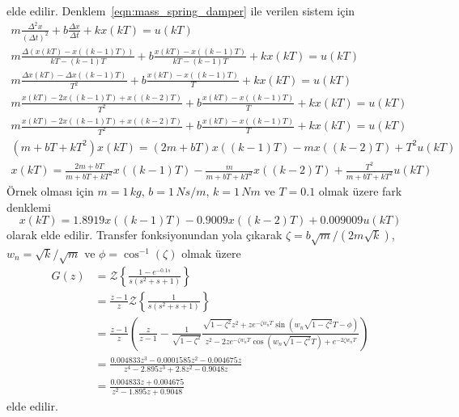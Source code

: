 elde edilir. Denklem~\ref{eqn:mass_spring_damper} ile verilen sistem için 
\begin{gather}
    m\frac{\Delta^2 x}{(\Delta t)^2}+b\frac{\Delta x}{\Delta t}+kx(kT)=u(kT)\nonumber\\
    m\frac{\Delta (x(kT)-x((k-1)T))}{kT-(k-1)T}+b\frac{x(kT)-x((k-1)T)}{kT-(k-1)T}+kx(kT)=u(kT)\nonumber\\
    m\frac{\Delta x(kT)-\Delta x((k-1)T)}{T^2}+b\frac{x(kT)-x((k-1)T)}{T}+kx(kT)=u(kT)\nonumber\\
    m\frac{x(kT)-2x((k-1)T)+x((k-2)T)}{T^2}+b\frac{x(kT)-x((k-1)T)}{T}+kx(kT)=u(kT)\nonumber\\
    m\frac{x(kT)-2x((k-1)T)+x((k-2)T)}{T^2}+b\frac{x(kT)-x((k-1)T)}{T}+kx(kT)=u(kT)\nonumber\\
    (m+bT+kT^2)x(kT)=(2m+bT)x((k-1)T)-mx((k-2)T)+T^2u(kT)\nonumber\\
    x(kT)=\frac{2m+bT}{m+bT+kT^2}x((k-1)T)-\frac{m}{m+bT+kT^2}x((k-2)T)+\frac{T^2}{m+bT+kT^2}u(kT)
\end{gather}
Örnek olması için $m=1\,kg$, $b=1\,Ns/m$, $k=1\,Nm$ ve $T=0.1$ olmak üzere fark denklemi
\begin{equation}
    x(kT)=1.8919x((k-1)T)-0.9009x((k-2)T)+0.009009u(kT)
\end{equation}
olarak elde edilir. Transfer fonksiyonundan yola çıkarak $\zeta=b\sqrt{m}/(2m\sqrt{k})$, $w_n=\sqrt{k}/\sqrt{m}$ ve $\phi=\cos^{-1}(\zeta)$ olmak üzere
\begin{equation}
\begin{split}
    G(z)&=\mathcal{Z}\left\{\frac{1-e^{-0.1s}}{s(s^2+s+1)}\right\}\\
    &=\frac{z-1}{z}\mathcal{Z}\left\{\frac{1}{s(s^2+s+1)}\right\}\\
    &=\frac{z-1}{z}\left(\frac{z}{z-1}-\frac{1}{\sqrt{1-\zeta^2}}\frac{\sqrt{1-\zeta^2}z^2+ze^{-\zeta w_nT}\sin(w_n\sqrt{1-\zeta^2}T-\phi)}{z^2-2ze^{-\zeta w_nT}\cos(w_n\sqrt{1-\zeta^2}T)+e^{-2\zeta w_nT}}\right)\\
    &=\frac{0.004833 z^3 - 0.0001585 z^2 - 0.004675 z}{ z^4 - 2.895 z^3 + 2.8 z^2 - 0.9048 z}\\
    &=\frac{0.004833 z + 0.004675}{z^2 - 1.895 z + 0.9048}
\end{split}
\end{equation}
elde edilir.